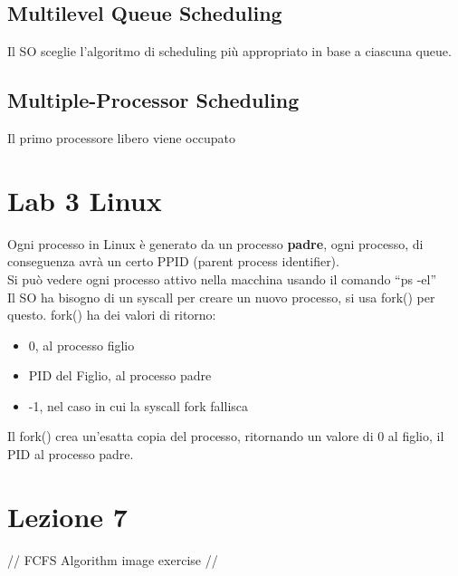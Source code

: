 \documentclass[12pt, a4paper]{article}
\begin{document}
	
	\subsection*{Multilevel Queue Scheduling}
	Il SO sceglie l'algoritmo di scheduling più appropriato in base a ciascuna queue.
	
	
	\subsection*{Multiple-Processor Scheduling}
	Il primo processore libero viene occupato
	
	
	\section*{Lab 3 Linux}
	
	Ogni processo in Linux è generato da un processo \textbf{padre}, ogni processo, di conseguenza avrà un certo PPID (parent process identifier). \\ Si può vedere ogni processo attivo nella macchina usando il comando ``ps -el'' \\
	Il SO ha bisogno di un syscall per creare un nuovo processo, si usa fork() per questo. fork() ha dei valori di ritorno:
	\begin{itemize}
		\item 0, al processo figlio
		\item PID del Figlio, al processo padre
		\item -1, nel caso in cui la syscall fork fallisca
	\end{itemize}
	Il fork() crea un'esatta copia del processo, ritornando un valore di 0 al figlio, il PID al processo padre.
	
	
	\section*{Lezione 7}
	
	// FCFS Algorithm image exercise // \\ \\
	
\end{document}
